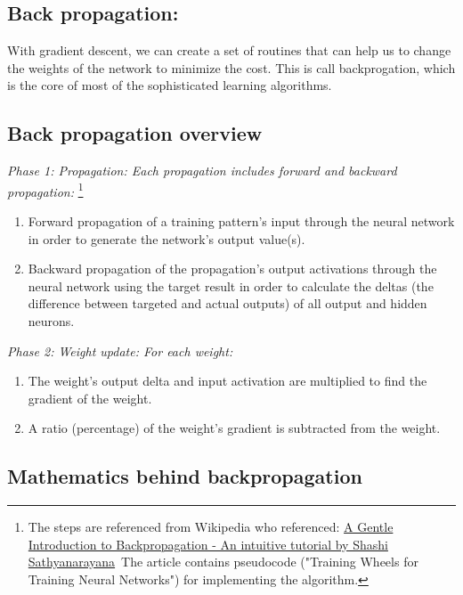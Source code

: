 \documentclass[]{article}
\begin{document}
\begin{multicols}{2}

\section{Back propagation:}

With gradient descent, we can create a set of routines that can help us
to change the weights of the network to minimize the cost. This is call backprogation, which is the core of most of the  sophisticated learning algorithms. 

\subsection{Back propagation overview}

\emph{Phase 1: Propagation: Each propagation
includes forward and backward propagation:}
\footnote{The steps are referenced from
Wikipedia who referenced:
\href{http://numericinsight.com/uploads/A_Gentle_Introduction_to_Backpropagation.pdf}{A
Gentle Introduction to Backpropagation - An intuitive tutorial by
Shashi Sathyanarayana}~The article contains pseudocode ("Training
Wheels for Training Neural Networks") for implementing the algorithm.}  

\begin{enumerate}
\def\labelenumi{\arabic{enumi}.}
\item
  Forward propagation of a training pattern's input through the neural
  network in order to generate the network's output value(s). 
\item
  Backward propagation of the propagation's output activations through
  the neural network using the target result in order to
  calculate the deltas (the difference between targeted and actual
  outputs) of all output and hidden neurons.
\end{enumerate}

\emph{
Phase 2: Weight update: For each weight:}

\begin{enumerate}
\def\labelenumi{\arabic{enumi}.}
\item
  The weight's output delta and input activation are multiplied to find
  the gradient of the weight.
\item
  A ratio (percentage) of the weight's gradient is subtracted from the
  weight.
\end{enumerate}

\subsection{Mathematics behind backpropagation}


\end{multicols}
\end{document}
